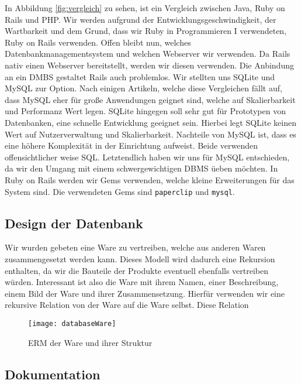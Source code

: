 \documentclass[pdftex,10pt,a4paper]{article}
\begin{document}
In Abbildung \ref{fig:vergleich} zu sehen, ist ein Vergleich zwischen Java, Ruby on Rails und PHP. Wir werden aufgrund der Entwicklungsgeschwindigkeit, der Wartbarkeit und dem Grund, dass wir Ruby in Programmieren I verwendeten, Ruby on Rails verwenden. Offen bleibt nun, welches Datenbankmanagementsystem und welchen Webserver wir verwenden. Da Rails nativ einen Webserver bereitstellt, werden wir diesen verwenden. Die Anbindung an ein DMBS gestaltet Rails auch problemlos. Wir stellten uns SQLite und MySQL zur Option. Nach einigen Artikeln, welche diese Vergleichen f\"allt auf, dass MySQL eher f\"ur gro{\ss}e Anwendungen geignet sind, welche auf Skalierbarkeit und Performanz Wert legen. SQLite hingegen soll sehr gut f\"ur Prototypen von Datenbanken, eine schnelle Entwicklung geeignet sein. Hierbei legt SQLite keinen Wert auf Nutzerverwaltung und Skalierbarkeit. Nachteile von MySQL ist, dass es eine h\"ohere Komplexit\"at in der Einrichtung aufweist. Beide verwenden offensichtlicher weise SQL. Letztendlich haben wir uns f\"ur MySQL entschieden, da wir den Umgang mit einem schwergewichtigen DBMS \"ueben m\"ochten. In Ruby on Rails werden wir Gems verwenden, welche kleine Erweiterungen f\"ur das System sind. Die verwendeten Gems sind \texttt{paperclip} und \texttt{mysql}.

\subsection{Design der Datenbank}
\label{sec:dbdesign}
Wir wurden gebeten eine Ware zu vertreiben, welche aus anderen Waren zusammengesetzt werden kann. Dieses Modell wird dadurch eine Rekursion enthalten, da wir die Bauteile der Produkte eventuell ebenfalls vertreiben w\"urden. Interessant ist also die Ware mit ihrem Namen, einer Beschreibung, einem Bild der Ware und ihrer Zusammensetzung. Hierf\"ur verwenden wir eine rekursive Relation von der Ware auf die Ware selbst. Diese Relation 

\begin{wrapfigure}{R}{0.5\textwidth}
  	\begin{center}
    	\texttt{[image: databaseWare]}
 	 \end{center}
   \caption{ERM der Ware und ihrer Struktur}
\end{wrapfigure}

\subsection{Dokumentation}
\end{document}
